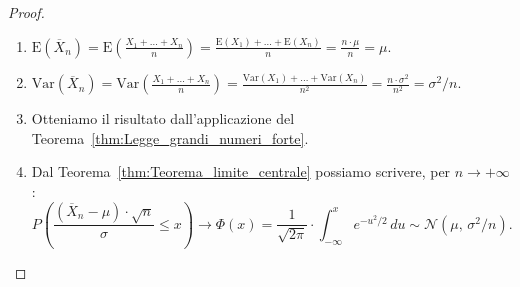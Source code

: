         \begin{proof}
            \hfill
            \begin{enumerate}
                \item $\text{E}(\overline{X}_n) = \text{E}\left(\frac{X_1 + \ldots + X_{n}}{n}\right) = 
                    \frac{\text{E}(X_1) + \ldots + \text{E}(X_n)}{n} = \frac{n\cdot\mu}{n} = \mu$.
                \item $\text{Var}(\overline{X}_n) = \text{Var}\left(\frac{X_1 + \ldots + X_{n}}{n}\right) =
                    \frac{\text{Var}(X_1) + \ldots + \text{Var}(X_n)}{n^2} = \frac{n\cdot\sigma^2}{n^2} =
                    \sigma^2 /n$.
                \item Otteniamo il risultato dall'applicazione del Teorema~\ref{thm:Legge_grandi_numeri_forte}.
                \item Dal Teorema~\ref{thm:Teorema_limite_centrale} possiamo scrivere, 
                    per $n\rightarrow +\infty$: \[
                    P\left(\frac{(\overline{X}_n - \mu)\cdot \sqrt{n}}{\sigma} \leq x\right) \rightarrow
                    \Phi(x) = \frac{1}{\sqrt{2\pi}} \cdot \int_{-\infty}^{x} e^{-u^2 /2}\, du \sim 
                    \mathcal{N}(\mu,\, \sigma^2 /n)
                .\]
            \end{enumerate}
        \end{proof}

